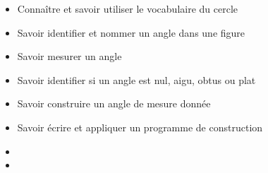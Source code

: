 \begin{myobj}
	\begin{itemize}
		\item Connaître et savoir utiliser le vocabulaire du cercle
		\item Savoir identifier et nommer un angle dans une figure
		\item Savoir mesurer un angle
		\item Savoir identifier si un angle est nul, aigu, obtus ou plat
		\item Savoir construire un angle de mesure donnée
		\item Savoir écrire et appliquer un programme de construction		
	\end{itemize}
\end{myobj}

\begin{mycomp}
	\begin{itemize}
		
		\item {} 
		\item {}
		
	\end{itemize}
\end{mycomp}